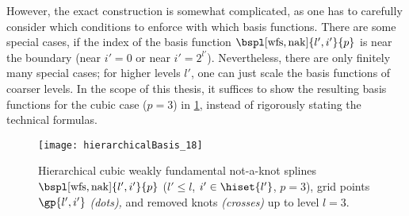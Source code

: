 However, the exact construction is somewhat complicated,
as one has to carefully consider which conditions to enforce
with which basis functions.
There are some special cases, if the index of the basis function
$\bspl[\wfs,\nak]{l',i'}{p}$ is near the boundary
(near $i' = 0$ or near $i' = 2^{l'}$).
Nevertheless, there are only finitely many special cases;
for higher levels $l'$, one can just scale the basis functions
of coarser levels.
In the scope of this thesis,
it suffices to show the resulting basis functions for
the cubic case ($p = 3$) in
\cref{fig:hierarchicalWeaklyFundamentalNotAKnotSpline},
instead of rigorously stating the technical formulas.

\begin{SCfigure}
  \texttt{[image: hierarchicalBasis\_18]}%
  \caption[%
    Hierarchical weakly fundamental not-a-knot splines%
  ]{%
    Hierarchical cubic weakly fundamental not-a-knot splines
    $\bspl[\wfs,\nak]{l',i'}{p}$
    ($l' \le l$, $i' \in \hiset{l'}$, $p = 3$),
    grid points $\gp{l',i'}$ \emph{(dots),} and
    removed knots \emph{(crosses)} up to level $l = 3$.%
  }%
  \label{fig:hierarchicalWeaklyFundamentalNotAKnotSpline}%
\end{SCfigure}
